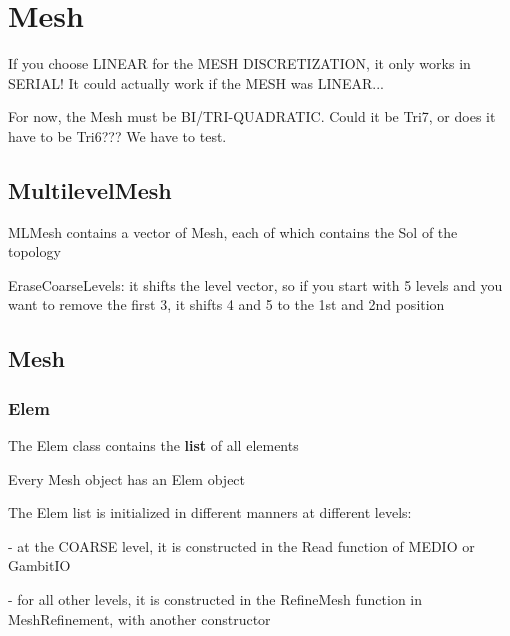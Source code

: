 \documentclass[10pt]{book}
\begin{document}
 
 \chapter{ Mesh}

    
 If you choose LINEAR for the MESH DISCRETIZATION, it only works in SERIAL! It could actually work if the MESH was LINEAR...
 
 For now, the Mesh must be BI/TRI-QUADRATIC. Could it be Tri7, or does it have to be Tri6??? We have to test.
 
 
   
     \section{MultilevelMesh}
   
   

     MLMesh  contains a vector of Mesh, each of which contains the Sol of the topology


   
  EraseCoarseLevels: it shifts the level vector, 
   so if you start with 5 levels and you want to remove the first 3,
   it shifts 4 and 5 to the 1st and 2nd position 
   
   \section{Mesh}
   
  
   \subsection{Elem}
  
  The Elem class contains the \textbf{list} of all elements
  
  Every Mesh object has an Elem object
  
  The Elem list is initialized in different manners at different levels:
  
  - at the COARSE level, it is constructed in the Read function of MEDIO or GambitIO
  
  - for all other levels, it is constructed in the RefineMesh function in MeshRefinement, with another constructor
  
  
  
  
  
\end{document}

